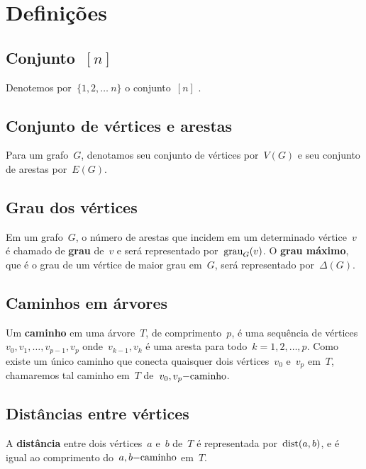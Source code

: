 \section{Definições}
	
	\subsection*{Conjunto~$[n]$}
	Denotemos por~$\{1,2,\ldots~n\}$
	o conjunto~$[n]$ .

	\subsection*{Conjunto de vértices e arestas}
	Para um grafo~$G$, denotamos seu
	conjunto de vértices por~$V(G)$ e seu
	conjunto de arestas por~$E(G)$.

	\subsection*{Grau dos vértices}
	Em um grafo~$G$, o número de arestas que incidem em um 
	determinado vértice~$v$ é chamado de 
	\textbf{grau} de~$v$ e será representado
	por~$\mathrm{grau}_G(v)$. O 
	\textbf{grau máximo}, que é o grau de um vértice de
	maior grau em~$G$, será representado por~$\Delta(G)$.

	\subsection*{Caminhos em árvores}
	Um \textbf{caminho} em uma árvore~$T$, de 
	comprimento~$p$, é uma sequência de 
	vértices~$v_0, v_1, \ldots,v_{p-1}, v_p$ 
	onde~$v_{k-1}, v_k$ é uma aresta para 
	todo~${k =1,2, \ldots, p}$. 
	Como existe um único caminho que conecta quaisquer dois 
	vértices~$v_0$ e~$v_p$ em~$T$, chamaremos tal caminho em~$T$ 
	de~$v_0,v_p\mathrm{-caminho}$.

	\subsection*{Distâncias entre vértices}
	A \textbf{distância} entre dois vértices~$a$ e~$b$ de~$T$ é 
	representada por~$\mathrm{dist}(a,b)$, e é igual ao comprimento 
	do~$a,b\mathrm{-caminho}$ em~$T$.
